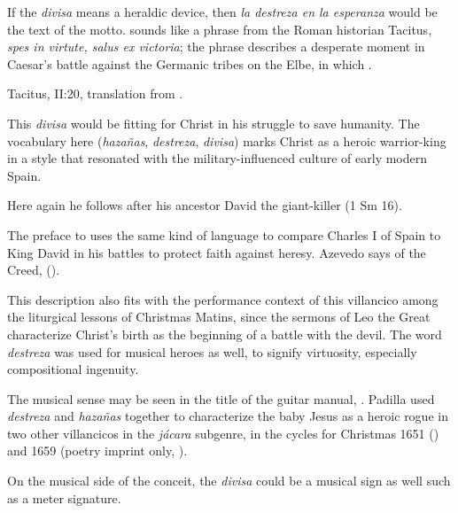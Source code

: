 If the \emph{divisa} means a heraldic device, then \emph{la destreza en la
esperanza} would be the text of the motto.
 sounds like a phrase from the Roman historian
Tacitus, \emph{spes in virtute, salus ex victoria}; the phrase describes a
desperate moment in Caesar's battle against the Germanic tribes on the Elbe, in
which .%
\begin{Footnote}
    Tacitus,  II:20, translation from
    \autocite[49]{Tacitus:Annales-English}.
\end{Footnote}
This \emph{divisa} would be fitting for Christ in his struggle to save humanity.
The vocabulary here (\emph{hazañas}, \emph{destreza}, \emph{divisa}) marks
Christ as a heroic warrior-king in a style that resonated with the
military-influenced culture of early modern Spain. 

Here again he follows after his ancestor David the giant-killer (1 Sm 16).%
\begin{Footnote}
    The preface to \autocite{Azevedo:Catecismo} uses the same kind of language
    to compare Charles I of Spain to King David in his battles to protect faith
    against heresy. 
    Azevedo says of the Creed,  ().
\end{Footnote}
This description also fits with the performance context of this villancico among
the liturgical lessons of Christmas Matins, since the sermons of Leo the Great
characterize Christ's birth as the beginning of a battle with the devil.
The word \emph{destreza} was used for musical heroes as well, to signify
virtuosity, especially compositional ingenuity.%
\begin{Footnote}
    \Autocite
    [: ]
    {Covarrubias:Tesoro}
    The musical sense may be seen in the title of the guitar manual,
    \autocite{Sanz:Guitarra}.
    Padilla used \emph{destreza} and \emph{hazañas} together to characterize the
    baby Jesus as a heroic rogue in two other villancicos in the \emph{jácara}
    subgenre, in the cycles for Christmas 1651 () and 1659
    (poetry imprint only, ).
\end{Footnote}
On the musical side of the conceit, the \emph{divisa} could be a musical sign as
well such as a meter signature.

